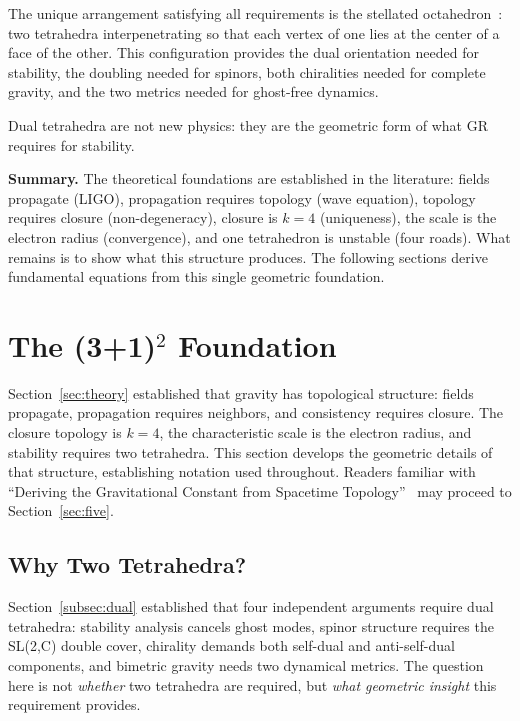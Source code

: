 \documentclass[aps,prd,preprint,superscriptaddress,showpacs,preprintnumbers,amsmath,amssymb,nofootinbib]{revtex4-2}
\begin{document}
The unique arrangement satisfying all requirements is the stellated octahedron~\cite{coxeter1973}: two tetrahedra interpenetrating so that each vertex of one lies at the center of a face of the other. This configuration provides the dual orientation needed for stability, the doubling needed for spinors, both chiralities needed for complete gravity, and the two metrics needed for ghost-free dynamics.

Dual tetrahedra are not new physics: they are the geometric form of what GR requires for stability.

\vspace{1em}
\noindent\textbf{Summary.} The theoretical foundations are established in the literature: fields propagate (LIGO), propagation requires topology (wave equation), topology requires closure (non-degeneracy), closure is $k = 4$ (uniqueness), the scale is the electron radius (convergence), and one tetrahedron is unstable (four roads). What remains is to show what this structure produces. The following sections derive fundamental equations from this single geometric foundation.

\section{The (3+1)$^2$ Foundation}
\label{sec:foundation}

Section~\ref{sec:theory} established that gravity has topological structure: fields propagate, propagation requires neighbors, and consistency requires closure. The closure topology is $k = 4$, the characteristic scale is the electron radius, and stability requires two tetrahedra. This section develops the geometric details of that structure, establishing notation used throughout. Readers familiar with ``Deriving the Gravitational Constant from Spacetime Topology''~\cite{paper6} may proceed to Section~\ref{sec:five}.

\subsection{Why Two Tetrahedra?}
\label{subsec:two-tet}

Section~\ref{subsec:dual} established that four independent arguments require dual tetrahedra: stability analysis cancels ghost modes, spinor structure requires the SL(2,C) double cover, chirality demands both self-dual and anti-self-dual components, and bimetric gravity needs two dynamical metrics. The question here is not \emph{whether} two tetrahedra are required, but \emph{what geometric insight} this requirement provides.
\end{document}
